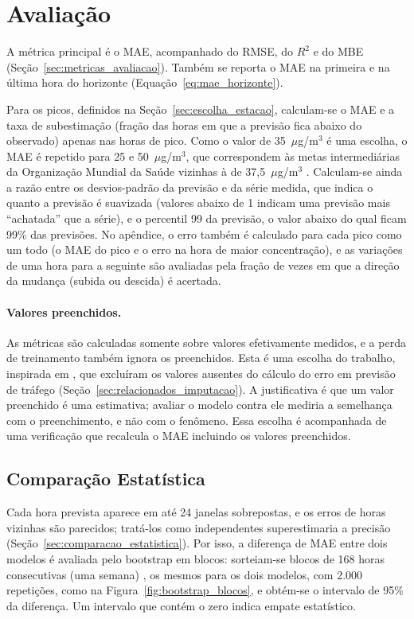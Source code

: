 \section{Avaliação}
\label{sec:metricas}

A métrica principal é o MAE, acompanhado do RMSE, do \(R^2\) e do MBE (Seção~\ref{sec:metricas_avaliacao}). Também se reporta o MAE na primeira e na última hora do horizonte (Equação~\ref{eq:mae_horizonte}).

Para os picos, definidos na Seção~\ref{sec:escolha_estacao}, calculam-se o MAE e a taxa de subestimação (fração das horas em que a previsão fica abaixo do observado) apenas nas horas de pico. Como o valor de 35~\(\mu\)g/m\(^3\) é uma escolha, o MAE é repetido para 25 e 50~\(\mu\)g/m\(^3\), que correspondem às metas intermediárias da Organização Mundial da Saúde vizinhas à de 37,5~\(\mu\)g/m\(^3\) \cite{who2021air}. Calculam-se ainda a razão entre os desvios-padrão da previsão e da série medida, que indica o quanto a previsão é suavizada (valores abaixo de 1 indicam uma previsão mais ``achatada'' que a série), e o percentil 99 da previsão, o valor abaixo do qual ficam 99\% das previsões. No apêndice, o erro também é calculado para cada pico como um todo (o MAE do pico e o erro na hora de maior concentração), e as variações de uma hora para a seguinte são avaliadas pela fração de vezes em que a direção da mudança (subida ou descida) é acertada.

\paragraph{Valores preenchidos.} As métricas são calculadas somente sobre valores efetivamente medidos, e a perda de treinamento também ignora os preenchidos. Esta é uma escolha do trabalho, inspirada em , que excluíram os valores ausentes do cálculo do erro em previsão de tráfego (Seção~\ref{sec:relacionados_imputacao}). A justificativa é que um valor preenchido é uma estimativa; avaliar o modelo contra ele mediria a semelhança com o preenchimento, e não com o fenômeno. Essa escolha é acompanhada de uma verificação que recalcula o MAE incluindo os valores preenchidos.

\subsection{Comparação Estatística}
\label{sec:inferencia_estatistica}

Cada hora prevista aparece em até 24 janelas sobrepostas, e os erros de horas vizinhas são parecidos; tratá-los como independentes superestimaria a precisão (Seção~\ref{sec:comparacao_estatistica}). Por isso, a diferença de MAE entre dois modelos é avaliada pelo bootstrap em blocos: sorteiam-se blocos de 168 horas consecutivas (uma semana) \cite{politis1992circular,kunsch1989jackknife}, os mesmos para os dois modelos, com 2.000 repetições, como na Figura~\ref{fig:bootstrap_blocos}, e obtém-se o intervalo de 95\% da diferença. Um intervalo que contém o zero indica empate estatístico.

